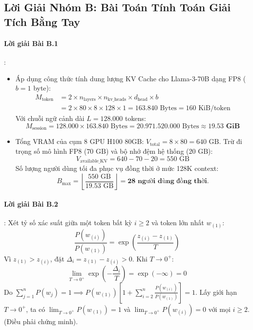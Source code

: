 \subsection{Lời Giải Nhóm B: Bài Toán Tính Toán Giải Tích Bằng Tay}

\paragraph{Lời giải Bài B.1}:
\begin{itemize}
  \item[a)] Áp dụng công thức tính dung lượng KV Cache cho Llama-3-70B dạng FP8 ($b=1$ byte):
  \begin{align*}
  M_{\text{token}} &= 2 \times n_{\text{layers}} \times n_{\text{kv\_heads}} \times d_{\text{head}} \times b \\
  &= 2 \times 80 \times 8 \times 128 \times 1 = 163.840\text{ Bytes} = 160\text{ KiB/token}
  \end{align*}
  Với chuỗi ngữ cảnh dài $L = 128.000$ tokens:
  \begin{equation*}
  M_{\text{session}} = 128.000 \times 163.840\text{ Bytes} = 20.971.520.000\text{ Bytes} \approx \mathbf{19.53\text{ GiB}}
  \end{equation*}

  \item[b)] Tổng VRAM của cụm 8 GPU H100 80GB: $V_{\text{total}} = 8 \times 80 = 640\text{ GB}$.
  Trừ đi trọng số mô hình FP8 ($70\text{ GB}$) và bộ nhớ đệm hệ thống ($20\text{ GB}$):
  \begin{equation*}
  V_{\text{available\_KV}} = 640 - 70 - 20 = 550\text{ GB}
  \end{equation*}
  Số lượng người dùng tối đa phục vụ đồng thời ở mức 128K context:
  \begin{equation*}
  B_{\max} = \left\lfloor \frac{550\text{ GB}}{19.53\text{ GB}} \right\rfloor = \mathbf{28\text{ người dùng đồng thời}}.
  \end{equation*}
\end{itemize}

\paragraph{Lời giải Bài B.2}:
Xét tỷ số xác suất giữa một token bất kỳ $i \ge 2$ và token lớn nhất $w_{(1)}$:
\begin{equation*}
\frac{P(w_{(i)})}{P(w_{(1)})} = \exp\left(\frac{z_{(i)} - z_{(1)}}{T}\right)
\end{equation*}
Vì $z_{(1)} > z_{(i)}$, đặt $\Delta_i = z_{(1)} - z_{(i)} > 0$. Khi $T \to 0^+$:
\begin{equation*}
\lim_{T \to 0^+} \exp\left(-\frac{\Delta_i}{T}\right) = \exp(-\infty) = 0
\end{equation*}
Do $\sum_{j=1}^n P(w_j) = 1 \implies P(w_{(1)}) \left[ 1 + \sum_{i=2}^n \frac{P(w_{(i)})}{P(w_{(1)})} \right] = 1$.
Lấy giới hạn $T \to 0^+$, ta có $\lim_{T \to 0^+} P(w_{(1)}) = 1$ và $\lim_{T \to 0^+} P(w_{(i)}) = 0$ với mọi $i \ge 2$. (Điều phải chứng minh).

